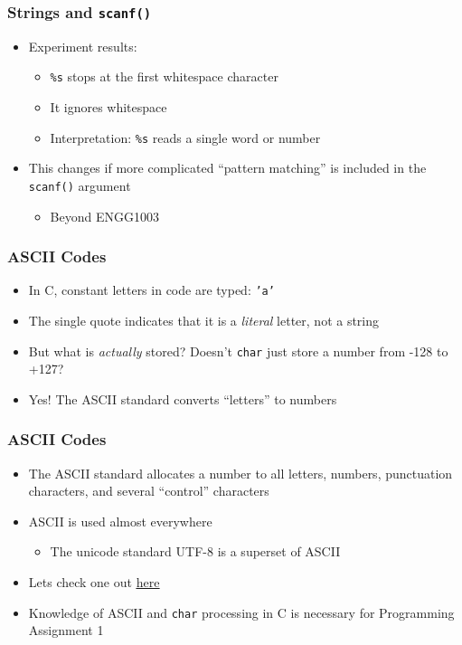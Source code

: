 \documentclass[14pt]{beamer}
\begin{document}
\begin{frame}
\frametitle{Strings and \texttt{scanf()}}
\begin{itemize}
\item Experiment results:
	\begin{itemize}
		\item \texttt{\%s} stops at the first whitespace character
		\item It ignores  whitespace
		\item Interpretation: \texttt{\%s} reads a single word or number
	\end{itemize}
\item This changes if more complicated ``pattern matching'' is included in the \texttt{scanf()} argument
	\begin{itemize}
		\item Beyond ENGG1003
	\end{itemize}
\end{itemize}
\end{frame}

\begin{frame}
\frametitle{ASCII Codes}
\begin{itemize}
\item In C, constant letters in code are typed: \texttt{'a'}
\item The single quote indicates that it is a \textit{literal} letter, not a string
\pause
\item But what is \textit{actually} stored? Doesn't \texttt{char} just store a number from -128 to +127?
\pause
\item Yes! The ASCII standard converts ``letters'' to numbers
\end{itemize}
\end{frame}

\begin{frame}
\frametitle{ASCII Codes}
\begin{itemize}
\item The ASCII standard allocates a number to all letters, numbers, punctuation characters, and several ``control'' characters
\item ASCII is used almost everywhere
	\begin{itemize}
		\item The unicode standard UTF-8 is a superset of ASCII
	\end{itemize}
\item Lets check one out \underline{\href{http://asciichart.com/}{here}}
\item Knowledge of ASCII and \texttt{char} processing in C is necessary for Programming Assignment 1
\end{itemize}
\end{frame}
\end{document}
